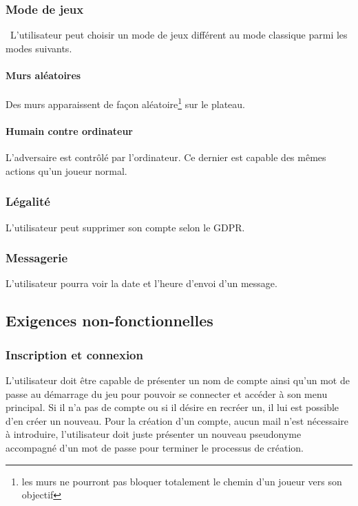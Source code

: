 \documentclass[french, utf8]{article}
\begin{document}
\subsubsection{Mode de jeux}
\
L'utilisateur peut choisir un mode de jeux différent au mode classique parmi les modes suivants.
\paragraph{Murs aléatoires}

Des murs apparaissent de façon aléatoire\footnote{les murs ne pourront pas bloquer totalement le chemin d'un joueur vers son objectif} sur le plateau.
\paragraph{Humain contre ordinateur}

L'adversaire est contrôlé par l'ordinateur. Ce dernier est capable des mêmes actions qu'un joueur normal.


\subsubsection{Légalité}
L'utilisateur peut supprimer son compte selon le GDPR.

\subsubsection{Messagerie}
L'utilisateur pourra voir la date et l'heure d'envoi d'un message.

\subsection{Exigences non-fonctionnelles}
\subsubsection{Inscription et connexion}
L'utilisateur doit être capable de présenter un nom de compte ainsi qu'un mot de passe au démarrage du jeu pour pouvoir se connecter et accéder à son menu principal. Si il n'a pas de compte ou si il désire en recréer un, il lui est possible d'en créer un nouveau. Pour la création d'un compte, aucun mail n'est nécessaire à introduire, l'utilisateur doit juste présenter un nouveau pseudonyme accompagné d'un mot de passe pour terminer le processus de création. \newline
\end{document}
